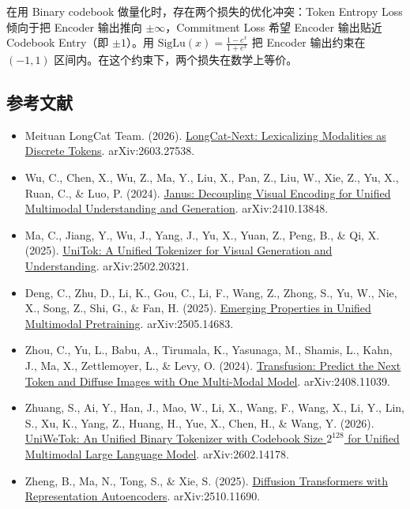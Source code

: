 在用 Binary codebook 做量化时，存在两个损失的优化冲突：Token Entropy Loss 倾向于把 Encoder 输出推向 \(\pm\infty\)，Commitment Loss 希望 Encoder 输出贴近 Codebook Entry（即 \(\pm1\)）。用 \(\mathrm{SigLu}(x)=\frac{1-e^x}{1+e^x}\) 把 Encoder 输出约束在 \((-1,1)\) 区间内。在这个约束下，两个损失在数学上等价。

\hypertarget{ux53c2ux8003ux6587ux732e-146}{%
\subsection{参考文献}\label{ux53c2ux8003ux6587ux732e-146}}

\vspace{0.25em}
\begin{itemize}
\tightlist
\item
  Meituan LongCat Team. (2026). \href{https://arxiv.org/abs/2603.27538}{LongCat-Next: Lexicalizing Modalities as Discrete Tokens}. arXiv:2603.27538.
\item
  Wu, C., Chen, X., Wu, Z., Ma, Y., Liu, X., Pan, Z., Liu, W., Xie, Z., Yu, X., Ruan, C., \& Luo, P. (2024). \href{https://arxiv.org/abs/2410.13848}{Janus: Decoupling Visual Encoding for Unified Multimodal Understanding and Generation}. arXiv:2410.13848.
\item
  Ma, C., Jiang, Y., Wu, J., Yang, J., Yu, X., Yuan, Z., Peng, B., \& Qi, X. (2025). \href{https://arxiv.org/abs/2502.20321}{UniTok: A Unified Tokenizer for Visual Generation and Understanding}. arXiv:2502.20321.
\item
  Deng, C., Zhu, D., Li, K., Gou, C., Li, F., Wang, Z., Zhong, S., Yu, W., Nie, X., Song, Z., Shi, G., \& Fan, H. (2025). \href{https://arxiv.org/abs/2505.14683}{Emerging Properties in Unified Multimodal Pretraining}. arXiv:2505.14683.
\item
  Zhou, C., Yu, L., Babu, A., Tirumala, K., Yasunaga, M., Shamis, L., Kahn, J., Ma, X., Zettlemoyer, L., \& Levy, O. (2024). \href{https://arxiv.org/abs/2408.11039}{Transfusion: Predict the Next Token and Diffuse Images with One Multi-Modal Model}. arXiv:2408.11039.
\item
  Zhuang, S., Ai, Y., Han, J., Mao, W., Li, X., Wang, F., Wang, X., Li, Y., Lin, S., Xu, K., Yang, Z., Huang, H., Yue, X., Chen, H., \& Wang, Y. (2026). \href{https://arxiv.org/abs/2602.14178}{UniWeTok: An Unified Binary Tokenizer with Codebook Size \(2^{128}\) for Unified Multimodal Large Language Model}. arXiv:2602.14178.
\item
  Zheng, B., Ma, N., Tong, S., \& Xie, S. (2025). \href{https://arxiv.org/abs/2510.11690}{Diffusion Transformers with Representation Autoencoders}. arXiv:2510.11690.

\end{itemize}
